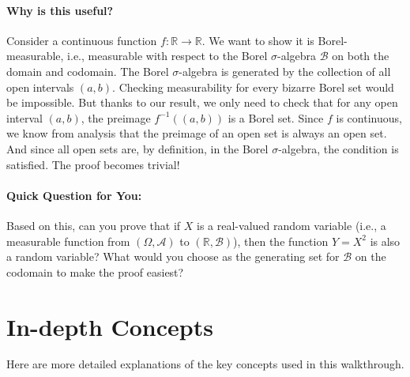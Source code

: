 \documentclass[11pt,a4paper]{article}
\theoremstyle{exercise_style}
\theoremstyle{definition}
\begin{document}
\paragraph{Why is this useful?} Consider a continuous function $f: \mathbb{R} \to \mathbb{R}$. We want to show it is Borel-measurable, i.e., measurable with respect to the Borel $\sigma$-algebra $\mathcal{B}$ on both the domain and codomain. The Borel $\sigma$-algebra is generated by the collection of all open intervals $(a, b)$. Checking measurability for every bizarre Borel set would be impossible. But thanks to our result, we only need to check that for any open interval $(a, b)$, the preimage $f^{-1}((a, b))$ is a Borel set. Since $f$ is continuous, we know from analysis that the preimage of an open set is always an open set. And since all open sets are, by definition, in the Borel $\sigma$-algebra, the condition is satisfied. The proof becomes trivial!

\paragraph{Quick Question for You:}
Based on this, can you prove that if $X$ is a real-valued random variable (i.e., a measurable function from $(\Omega, \mathcal{A})$ to $(\mathbb{R}, \mathcal{B})$), then the function $Y = X^2$ is also a random variable? What would you choose as the generating set for $\mathcal{B}$ on the codomain to make the proof easiest?

\newpage

\section{In-depth Concepts}
\label{sec:concepts}
Here are more detailed explanations of the key concepts used in this walkthrough.
\end{document}
